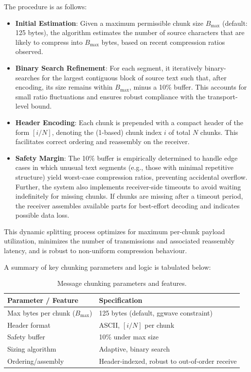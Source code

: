 \documentclass[12pt,openany]{article}
\theoremstyle{definition}
\theoremstyle{definition}
\theoremstyle{definition}
\begin{document}
The procedure is as follows:

\begin{itemize}
    \item \textbf{Initial Estimation}: Given a maximum permissible chunk size $B_{\text{max}}$ (default: 125 bytes), the algorithm estimates the number of source characters that are likely to compress into $B_{\text{max}}$ bytes, based on recent compression ratios observed.
    \item \textbf{Binary Search Refinement}: For each segment, it iteratively binary-searches for the largest contiguous block of source text such that, after encoding, its size remains within $B_{\text{max}}$, minus a 10\% buffer. This accounts for small ratio fluctuations and ensures robust compliance with the transport-level bound.
    \item \textbf{Header Encoding}: Each chunk is prepended with a compact header of the form $[i/N]$, denoting the (1-based) chunk index $i$ of total $N$ chunks. This facilitates correct ordering and reassembly on the receiver.
    \item \textbf{Safety Margin}: The 10\% buffer is empirically determined to handle edge cases in which unusual text segments (e.g., those with minimal repetitive structure) yield worst-case compression ratios, preventing accidental overflow. Further, the system also implements receiver-side timeouts to avoid waiting indefinitely for missing chunks. If chunks are missing after a timeout period, the receiver assembles available parts for best-effort decoding and indicates possible data loss.

\end{itemize}

This dynamic splitting process optimizes for maximum per-chunk payload utilization, minimizes the number of transmissions and associated reassembly latency, and is robust to non-uniform compression behaviour.

A summary of key chunking parameters and logic is tabulated below:

\begin{table}[h]
\centering
\begin{tabular}{|l|l|}
\hline
\textbf{Parameter / Feature} & \textbf{Specification} \\
\hline
Max bytes per chunk ($B_{\text{max}}$) & 125 bytes (default, ggwave constraint) \\
Header format & ASCII, $[i/N]$ per chunk \\
Safety buffer & 10\% under max size \\
Sizing algorithm & Adaptive, binary search \\
Ordering/assembly & Header-indexed, robust to out-of-order receive \\
\hline
\end{tabular}
\caption{Message chunking parameters and features.}
\label{tab:chunking-parameters}
\end{table}
\end{document}

